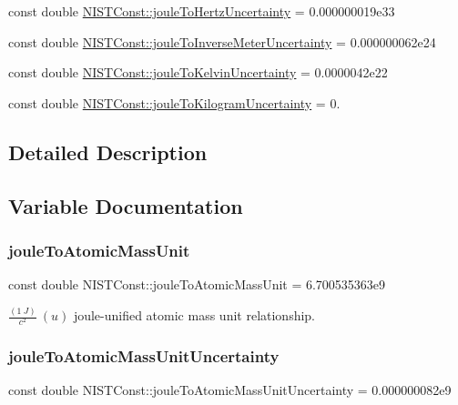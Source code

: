\begin{DoxyCompactItemize}
const double \hyperlink{group___n_i_s_t_const-_joule_ga059f125fb7eede11c5b14b45349fe18e}{N\+I\+S\+T\+Const\+::joule\+To\+Hertz\+Uncertainty} = 0.\+000000019e33
\item 
const double \hyperlink{group___n_i_s_t_const-_joule_gaed9939434cab903ad8dbc9d4da1d5e0c}{N\+I\+S\+T\+Const\+::joule\+To\+Inverse\+Meter\+Uncertainty} = 0.\+000000062e24
\item 
const double \hyperlink{group___n_i_s_t_const-_joule_ga32d9bd2dfbaa6786b317c517b17c2f59}{N\+I\+S\+T\+Const\+::joule\+To\+Kelvin\+Uncertainty} = 0.\+0000042e22
\item 
const double \hyperlink{group___n_i_s_t_const-_joule_gaf14b109cdaf9892023dc33ceecdc0b9f}{N\+I\+S\+T\+Const\+::joule\+To\+Kilogram\+Uncertainty} = 0.
\end{DoxyCompactItemize}


\subsection{Detailed Description}


\subsection{Variable Documentation}
\mbox{\label{group___n_i_s_t_const-_joule_ga6a8cba6b834ee62ab61671208b1ae9ee}} 
\subsubsection{\texorpdfstring{joule\+To\+Atomic\+Mass\+Unit}{jouleToAtomicMassUnit}}
{\footnotesize\ttfamily const double N\+I\+S\+T\+Const\+::joule\+To\+Atomic\+Mass\+Unit = 6.\+700535363e9}

$\frac{(1\ J)}{c^2} \ (u)$ joule-\/unified atomic mass unit relationship. \mbox{\label{group___n_i_s_t_const-_joule_ga0fcd1cd8572c48695fadec809a5a1225}} 
\subsubsection{\texorpdfstring{joule\+To\+Atomic\+Mass\+Unit\+Uncertainty}{jouleToAtomicMassUnitUncertainty}}
{\footnotesize\ttfamily const double N\+I\+S\+T\+Const\+::joule\+To\+Atomic\+Mass\+Unit\+Uncertainty = 0.\+000000082e9}

